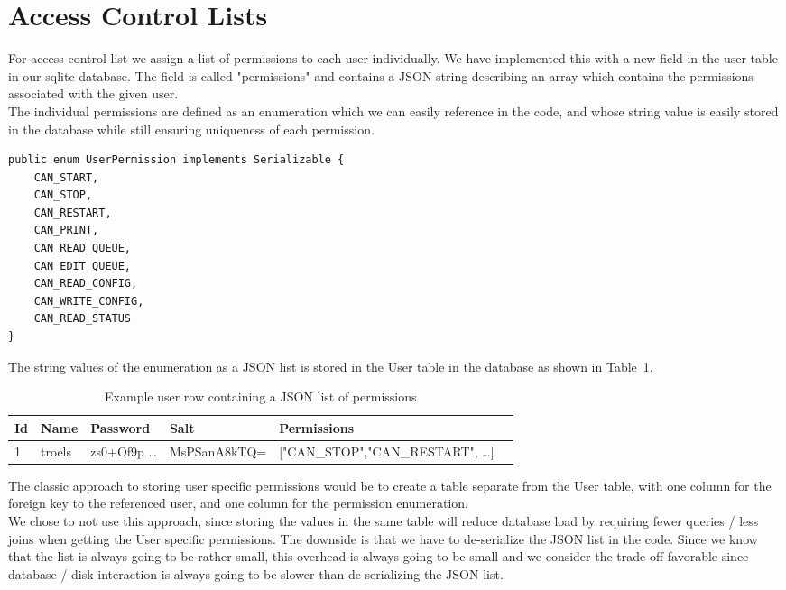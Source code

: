\documentclass[12pt]{article}
\begin{document}
\newpage

\section{Access Control Lists}
\label{sec:Access Control Lists}

For access control list we assign a list of permissions to each user individually. We have implemented this with a new field in the user table in our sqlite database. The field is called "permissions" and contains a JSON string describing an array which contains the permissions associated with the given user. \\
The individual permissions are defined as an enumeration which we can easily reference in the code, and whose string value is easily stored in the database while still ensuring uniqueness of each permission.

\begin{lstlisting}[caption=UserPermission enumerating the possible permissions on the server.]
public enum UserPermission implements Serializable {
    CAN_START,
    CAN_STOP,
    CAN_RESTART,
    CAN_PRINT,
    CAN_READ_QUEUE,
    CAN_EDIT_QUEUE,
    CAN_READ_CONFIG,
    CAN_WRITE_CONFIG,
    CAN_READ_STATUS
}
\end{lstlisting}

The string values of the enumeration as a JSON list is stored in the User table in the database as shown in Table~\ref{json-permissions}.

\begin{table}[H]
\centering
\begin{tabular}{|l|l|l|l|l|l|}
\hline
Id & Name & Password & Salt & Permissions \\
\hline
1 & troels & zs0+Of9p \ldots & MsPSanA8kTQ= & ["CAN\_STOP","CAN\_RESTART", \ldots] \\
\hline
\end{tabular}
\caption{Example user row containing a JSON list of permissions}
\label{json-permissions}
\end{table}

The classic approach to storing user specific permissions would be to create a table separate from the User table, with one column for the foreign key to the referenced user, and one column for the permission enumeration. \\
We chose to not use this approach, since storing the values in the same table will reduce database load by requiring fewer queries / less joins when getting the User specific permissions. The downside is that we have to de-serialize the JSON list in the code. Since we know that the list is always going to be rather small, this overhead is always going to be small and we consider the trade-off favorable since database / disk interaction is always going to be slower than de-serializing the JSON list.
\end{document}
